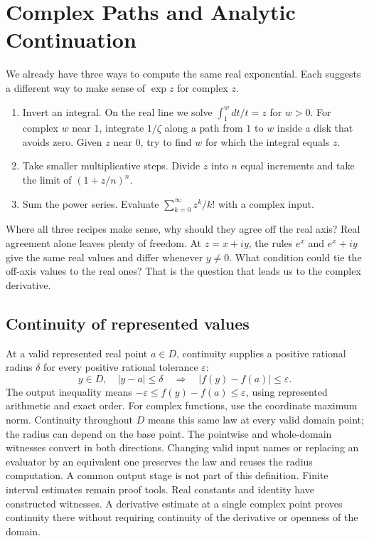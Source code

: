 \chapter{Complex Paths and Analytic Continuation}
\label{ch:complex-paths}

We already have three ways to compute the same real exponential. Each
suggests a different way to make sense of $\exp z$ for complex $z$.
\begin{enumerate}
\item Invert an integral. On the real line we solve $\int_1^w dt/t=z$
for $w>0$. For complex $w$ near $1$, integrate $1/\zeta$ along a path from
$1$ to $w$ inside a disk that avoids zero. Given $z$ near $0$, try to find
$w$ for which the integral equals $z$.
\item Take smaller multiplicative steps. Divide $z$ into $n$ equal
increments and take the limit of $(1+z/n)^n$.
\item Sum the power series. Evaluate $\sum_{k=0}^\infty z^k/k!$ with a
complex input.
\end{enumerate}

Where all three recipes make sense, why should they agree off the real
axis? Real agreement alone leaves plenty of freedom. At $z=x+iy$,
the rules $e^x$ and $e^x+iy$ give the same real values and differ whenever
$y\ne0$. What condition could tie the off-axis values to the real ones?
That is the question that leads us to the complex derivative.

\section{Continuity of represented values}
At a valid represented real point $a\in D$, continuity supplies a positive
rational radius $\delta$ for every positive rational tolerance $\varepsilon$:
\[
 y\in D,\quad |y-a|\le\delta
 \quad\Longrightarrow\quad |f(y)-f(a)|\le\varepsilon.
\]
The output inequality means $-\varepsilon\le f(y)-f(a)\le\varepsilon$,
using represented arithmetic and exact order. For complex functions, use
the coordinate maximum norm. Continuity throughout $D$ means this same law
at every valid domain point; the radius can depend on the base point.
The pointwise and whole-domain witnesses convert in both directions.
Changing valid input names or replacing an evaluator by an equivalent one
preserves the law and reuses the radius computation. A common output stage
is not part of this definition. Finite interval estimates remain proof tools.
Real constants and identity have constructed witnesses. A derivative estimate
at a single complex point proves continuity there without requiring continuity
of the derivative or openness of the domain.

